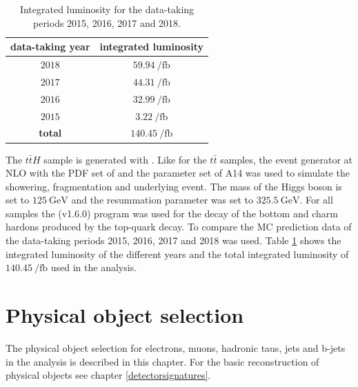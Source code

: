 %
\begin{table}[htbp]
		\centering
                \renewcommand{\arraystretch}{1.2}       
		\begin{tabular*}{\linewidth}{@{\extracolsep{\fill}}cc}
		\hline
		\hline
		\textbf{data-taking year}&  \textbf{integrated luminosity}
		\\
		\hline
                $2018$                & $\SI{59.94}{\per\femto\barn}$
                \\
                $2017$                & $\SI{44.31}{\per\femto\barn}$
                \\
                $2016$                & $\SI{32.99}{\per\femto\barn}$
                \\
                $2015$                & $\SI{3.22}{\per\femto\barn}$
                \\
                \hline
                \textbf{total}        & $\SI{140.45}{\per\femto\barn}$
                \\
		\hline
		\hline
		\end{tabular*}
		\caption[Integrated luminosity for the data-taking periods 2015-2018.]{Integrated luminosity for the data-taking periods 2015, 2016, 2017 and 2018.}
\label{datalumi}
\renewcommand{\arraystretch}{1}
\end{table}
%
The $t\bar{t}H$ sample is generated with {\POWHEG}. Like for the $t\bar{t}$ samples, the event generator {\Pythia} at NLO with the PDF set of {\NNPDFz} and the parameter set of A14 was used to simulate the showering, fragmentation and underlying event. The mass of the Higgs boson is set to $\SI{125}{\giga\electronvolt}$ and the resummation parameter was set to $\SI{325.5}{\giga\electronvolt}$. \newline
For all samples the {\EvtGen} (v1.6.0) \cite{EvtGen} program was used for the decay of the bottom and charm hardons produced by the top-quark decay.\newline
To compare the MC prediction data of the data-taking periods 2015, 2016, 2017 and 2018 was used. Table \ref{datalumi} shows the integrated luminosity of the different years and the total integrated luminosity of $\SI{140.45}{\per\femto\barn}$ used in the analysis.
\section{Physical object selection}\label{physObj}
The physical object selection for electrons, muons, hadronic taus, jets and b-jets in the analysis is described in this chapter. For the basic reconstruction of physical objects see chapter \ref{detectorsignatures}.
